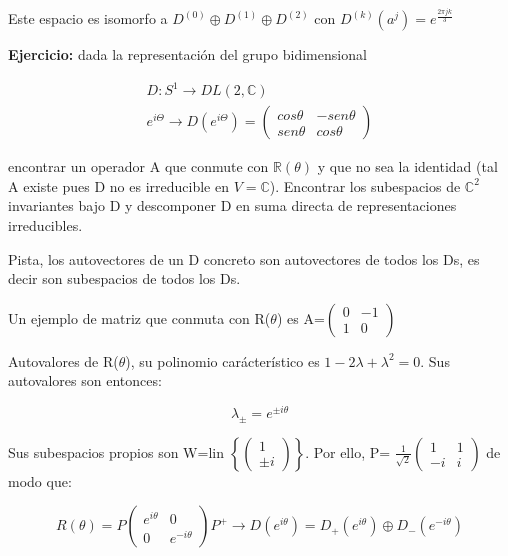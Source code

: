 \documentclass{article}
\begin{document}
    Este espacio es isomorfo a $D^{(0)}\oplus D^{(1)}\oplus D^{(2)}$ con $D^{(k)}(a^j)=e^{\frac{2\pi jk}{3}}$
    
    \bigskip
    \textbf{Ejercicio:} dada la representación del grupo bidimensional
    
    $$\begin{array}{cc}
         D: S^1 \to DL(2, \mathds{C})  \\
         e^{i\Theta}\to D(e^{i\Theta})= \left (\begin{array}{cc}
            cos \theta  & -sen \theta  \\
            sen \theta  & cos \theta
         \end{array}\right )
    \end{array}$$
    
    encontrar un operador A que conmute con $\mathds{R}(\theta)$ y que no sea la identidad (tal A existe pues D no es irreducible en $V=\mathds{C}$). Encontrar los subespacios de $\mathds{C}^2$ invariantes bajo D y descomponer D en suma directa de representaciones irreducibles.
    
    \bigskip
    
    Pista, los autovectores de un D concreto son autovectores de todos los Ds, es decir son subespacios de todos los Ds.
    
    \bigskip
    Un ejemplo de matriz que conmuta con R($\theta$) es A=$\left (\begin{array}{cc}
        0 & -1 \\
        1 & 0
    \end{array} \right)$
    
    Autovalores de R($\theta$), su polinomio carácterístico es $1-2\lambda +\lambda ^2=0$. Sus autovalores son entonces:
    
    $$\lambda_\pm =e^{\pm i\theta}$$
    
    Sus subespacios propios son W=lin $\left \lbrace \left ( \begin{array}{c}
         1  \\
         \pm i 
    \end{array}\right) \right\rbrace $.  Por ello, P= $ \frac{1}{\sqrt{2}}\left ( \begin{array}{cc}
         1 & 1 \\
         -i & i
    \end{array}\right) $ de modo que:
    
    $$R(\theta)=P\left( \begin{array}{cc}
        e^{i\theta} & 0 \\
        0 & e^{-i\theta}
    \end{array}\right)P^{+} \to D(e^{i\theta})=D_+(e^{i\theta})\oplus D_-(e^{-i\theta})$$
    
\end{document}
